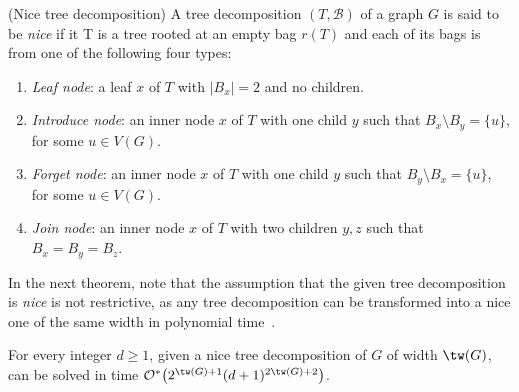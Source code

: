 \begin{definition}{(Nice tree decomposition)}
    A tree decomposition $(T, \mathcal{B})$ of a graph $G$ is said to be \emph{nice} if it T is a tree rooted at an empty bag $r(T)$ and each of its bags is from one of the following four types:
    \begin{enumerate}
        \item \textit{Leaf node}: a leaf $x$ of $T$ with $|B_x| = 2$ and no children.
        \item \textit{Introduce node}: an inner node $x$ of $T$ with one child $y$ such that $B_x \setminus B_y = \{u\}$, for some $u \in V(G)$.
        \item \textit{Forget node}: an inner node $x$ of $T$ with one child $y$ such that $B_y \setminus B_x = \{u\}$, for some $u \in V(G)$.
        \item \textit{Join node}: an inner node $x$ of $T$ with two children $y,z$ such that $B_x = B_y = B_z$.
    \end{enumerate}
\end{definition}


In the next theorem, note that the assumption that the given tree decomposition is \textit{nice} is not restrictive, as any tree decomposition can be transformed into a nice one of the same width in polynomial time~\cite{Klo94}.

\begin{theorem}\label{thm:treewidth}
    For every integer $d \geq 1$, given a nice tree decomposition of $G$ of width $\tw(G)$,  can be solved in time $\bigOs{2^{\tw(G)+1}(d+1)^{2\tw(G) + 2}}$.
\end{theorem}

